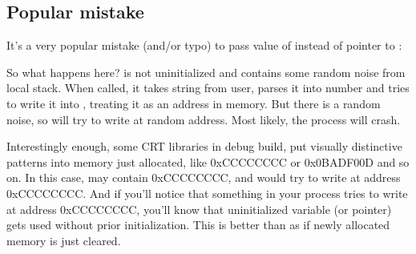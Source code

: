 \subsection{Popular mistake}

It's a very popular mistake (and/or typo) to pass value of  instead of pointer to :



So what happens here?
 is not uninitialized and contains some random noise from local stack.
When \scanf called, it takes string from user, parses it into number and tries to write it into , treating
it as an address in memory.
But there is a random noise, so \scanf will try to write at random address.
Most likely, the process will crash.

Interestingly enough, some \ac{CRT} libraries in debug build, put visually distinctive patterns
into memory just allocated, like 0xCCCCCCCC or 0x0BADF00D and so on.
In this case,  may contain 0xCCCCCCCC, and \scanf would try to write at address 0xCCCCCCCC.
And if you'll notice that something in your process tries to write at address 0xCCCCCCCC, you'll know
that uninitialized variable (or pointer) gets used without prior initialization.
This is better than as if newly allocated memory is just cleared.

